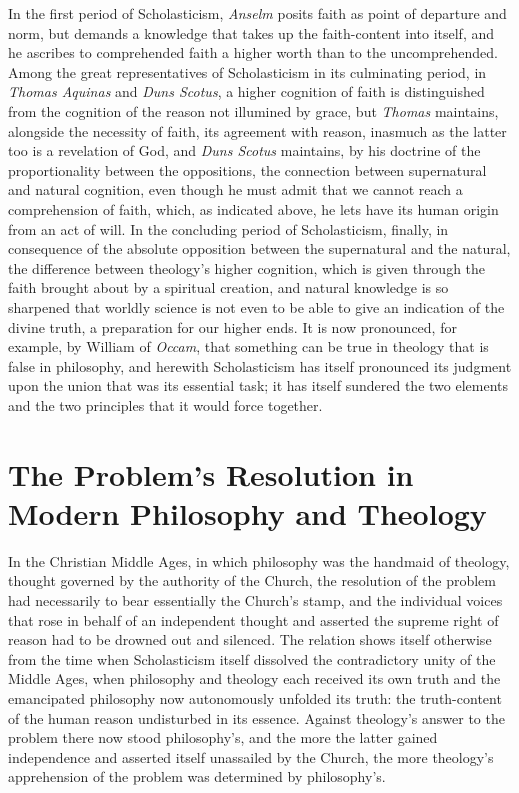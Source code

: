 \documentclass[12pt,a4paper]{book}
\begin{document}
In the first period of Scholasticism, \emph{Anselm} posits faith as point of
departure and norm, but demands a knowledge that takes up the faith-content
into itself, and he ascribes to comprehended faith a higher worth than to the
uncomprehended. Among the great representatives of Scholasticism in its
culminating period, in \emph{Thomas Aquinas} and \emph{Duns Scotus}, a higher cognition of
faith is distinguished from the cognition of the reason not illumined by
grace, but \emph{Thomas} maintains, alongside the necessity of faith, its agreement
with reason, inasmuch as the latter too is a revelation of God, and \emph{Duns
Scotus} maintains, by his doctrine of the proportionality between the
oppositions, the connection between supernatural and natural cognition, even
though he must admit that we cannot reach a comprehension of faith, which, as
indicated above, he lets have its human origin from an act of will. In the
concluding period of Scholasticism, finally, in consequence of the absolute
opposition between the supernatural and the natural, the difference between
theology's higher cognition, which is given through the faith brought about by
a spiritual creation, and natural knowledge is so sharpened that worldly
science is not even to be able to give an indication of the divine truth, a
preparation for our higher ends. It is now pronounced, for example, by William
of \emph{Occam}, that something can be true in theology that is false in philosophy,
and herewith Scholasticism has itself pronounced its judgment upon the union
that was its essential task; it has itself sundered the two elements and the
two principles that it would force together.

\section{The Problem's Resolution in Modern Philosophy and Theology}
\label{sec:modern}

\noindent In the Christian Middle Ages, in which philosophy was the handmaid
of theology, thought governed by the authority of the Church, the resolution
of the problem had necessarily to bear essentially the Church's stamp, and
the individual voices that rose in behalf of an independent thought and
asserted the supreme right of reason had to be drowned out and silenced. The
relation shows itself otherwise from the time when Scholasticism itself
dissolved the contradictory unity of the Middle Ages, when philosophy and
theology each received its own truth and the emancipated philosophy now
autonomously unfolded its truth: the truth-content of the human reason
undisturbed in its essence. Against theology's answer to the problem there now
stood philosophy's, and the more the latter gained independence and asserted
itself unassailed by the Church, the more theology's apprehension of the
problem was determined by philosophy's.
\end{document}
